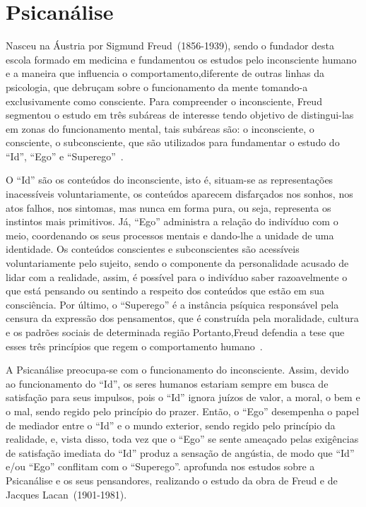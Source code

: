 \section{Psicanálise}\label{psicanalise}

Nasceu na Áustria por Sigmund Freud~(1856-1939), sendo o fundador desta escola formado em medicina e fundamentou os estudos pelo inconsciente humano e a maneira que influencia o comportamento,diferente de outras linhas da psicologia, que debruçam sobre o funcionamento da mente tomando-a exclusivamente como consciente.
Para compreender o inconsciente, Freud segmentou o estudo em três subáreas de interesse tendo objetivo de distingui-las em zonas do funcionamento mental, tais subáreas são: o inconsciente, o consciente, o subconsciente, que são utilizados para fundamentar o estudo do ``Id'', ``Ego'' e ``Superego''~\cite{hothersall1997historia}. 

O ``Id'' são os conteúdos do inconsciente, isto é, situam-se as representações inacessíveis voluntariamente, os conteúdos aparecem disfarçados nos sonhos, nos atos falhos, nos sintomas, mas nunca em forma pura, ou seja, representa os instintos mais primitivos. 
Já, ``Ego'' administra a relação do indivíduo com o meio, coordenando os seus processos mentais e dando-lhe a unidade de uma identidade. 
Os conteúdos conscientes e subconscientes são acessíveis voluntariamente pelo sujeito, sendo o componente da personalidade acusado de lidar com a realidade, assim, é possível para o indivíduo saber razoavelmente o que está pensando ou sentindo a respeito dos conteúdos que estão em sua consciência.
Por último, o ``Superego'' é a instância psíquica responsável pela censura da expressão dos pensamentos, que é construída pela moralidade, cultura e os padrões sociais de determinada região
Portanto,Freud defendia a tese que esses três princípios que regem o comportamento humano~\cite{silva2007psicologia_educacao}.

A Psicanálise preocupa-se com o funcionamento do inconsciente. 
Assim, devido ao funcionamento do ``Id'', os seres humanos estariam sempre em busca de satisfação para seus impulsos, pois o ``Id'' ignora juízos de valor, a moral, o bem e o mal, sendo regido pelo princípio do prazer.
Então, o ``Ego'' desempenha o papel de mediador entre o ``Id'' e o mundo exterior, sendo regido pelo
princípio da realidade, e, vista disso, toda vez que o ``Ego'' se sente ameaçado pelas exigências de satisfação
imediata do ``Id'' produz a sensação de angústia, de modo que  ``Id'' e/ou ``Ego'' conflitam com o ``Superego''.
 aprofunda nos estudos sobre a Psicanálise e os seus pensandores, realizando o estudo da obra de Freud e de Jacques Lacan~(1901-1981).

